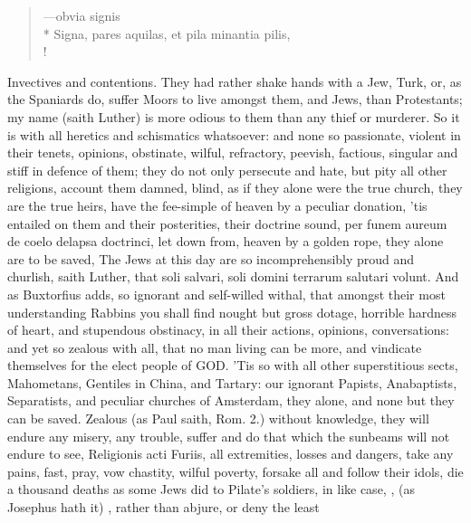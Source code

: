 {\begin{latin}
\begin{verse}%
---obvia signis\\*
Signa, pares aquilas, et pila minantia pilis,\\!
\end{verse}%
\end{latin}

Invectives and contentions. They had rather shake hands with a Jew,
Turk, or, as the Spaniards do, suffer Moors to live amongst them, and
Jews, than Protestants; my name (saith Luther) is more odious to
them than any thief or murderer. So it is with all heretics and
schismatics whatsoever: and none so passionate, violent in their
tenets, opinions, obstinate, wilful, refractory, peevish, factious,
singular and stiff in defence of them; they do not only persecute and
hate, but pity all other religions, account them damned, blind, as if
they alone were the true church, they are the true heirs, have the
fee-simple of heaven by a peculiar donation, 'tis entailed on them and
their posterities, their doctrine sound, per funem aureum de coelo
delapsa doctrinci, let down from, heaven by a golden rope, they alone
are to be saved, The Jews at this day are so incomprehensibly proud and
churlish, saith Luther, that soli salvari, soli domini terrarum
salutari volunt. And as Buxtorfius adds, so ignorant and
self-willed withal, that amongst their most understanding Rabbins you
shall find nought but gross dotage, horrible hardness of heart, and
stupendous obstinacy, in all their actions, opinions, conversations:
and yet so zealous with all, that no man living can be more, and
vindicate themselves for the elect people of \textsc{GOD}. 'Tis so with all
other superstitious sects, Mahometans, Gentiles in China, and Tartary:
our ignorant Papists, Anabaptists, Separatists, and peculiar churches
of Amsterdam, they alone, and none but they can be saved. Zealous
(as Paul saith, Rom.  2.) without knowledge, they will endure any
misery, any trouble, suffer and do that which the sunbeams will not
endure to see, Religionis acti Furiis, all extremities, losses and
dangers, take any pains, fast, pray, vow chastity, wilful poverty,
forsake all and follow their idols, die a thousand deaths as some Jews
did to Pilate's soldiers, in like case, , (as Josephus hath it) , rather than abjure, or deny the least
}

